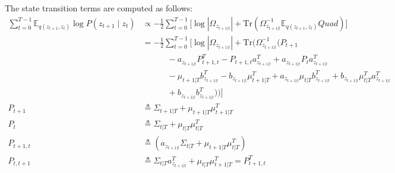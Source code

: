 \documentclass[11pt, reqno]{article}
\numberwithin{equation}{section}
\begin{document}
The state transition terms are computed as follows:
\begin{align*}
\sum_{t=0}^{T-1} \mathbb{E}_{q(z_{t+1}, z_t)} \log P(z_{t+1} \mid z_t) &\propto -\frac{1}{2} \sum_{t=0}^{T-1} \Bigg[\log |\Omega_{z_{t+1|t}}| + \mathrm{Tr}\left(\Omega_{z_{t+1|t}}^{-1}\mathbb{E}_{q(z_{t+1}, z_t)} Quad \right) \Bigg]\\
&= - \frac{1}{2} \sum_{t=0}^{T-1} \Bigg[\log |\Omega_{z_{t+1|t}}| + \mathrm{Tr}\Bigg(\Omega_{z_{t+1|t}}^{-1}\bigg(P_{t+1}  \\
&\hspace{3em} - a_{z_{t+1|t}}P_{t+1,t}^T - P_{t+1,t} a_{z_{t+1|t}}^T + a_{z_{t+1|t}}P_{t}a_{z_{t+1|t}}^T  \\
&\hspace{3em} - \mu_{t+1|T}b_{z_{t+1|t}}^T - b_{z_{t+1|t}}\mu_{t+1|T}^T  + a_{z_{t+1|t}}\mu_{t|T}b_{z_{t+1|t}}^T  + b_{z_{t+1|t}}\mu_{t|T}^T a_{z_{t+1|t}}^T  \\
&\hspace{3em} + b_{z_{t+1|t}}b_{z_{t+1|t}}^T  \bigg)\Bigg)\Bigg]\\
P_{t+1} &\triangleq \Sigma_{t+1|T}+\mu_{t+1|T}\mu_{t+1|T}^T\\
P_{t} &\triangleq \Sigma_{t|T} + \mu_{t|T}\mu_{t|T}^T\\
P_{t+1,t} &\triangleq (a_{z_{t+1|t}}\Sigma_{t|T} + \mu_{t+1|T}\mu_{t|T}^T)\\
P_{t,t+1} &\triangleq \Sigma_{t|T}a_{z_{t+1|t}}^T + \mu_{t|T}\mu_{t+1|T}^T = P_{t+1,t}^T \\
\end{align*}
\end{document}
